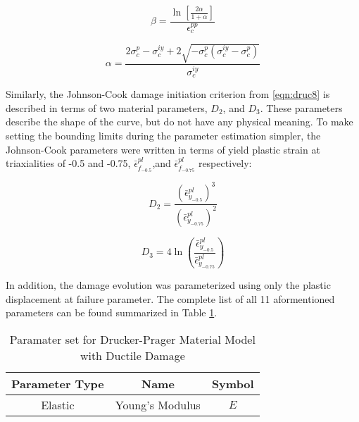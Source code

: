 \begin{equation}
\beta=\frac{\ln\left[\frac{2\alpha}{1+\alpha} \right ]}{\epsilon_c^{pp}}
\label{eqn:param2-2}
\end{equation}

\begin{equation}
\alpha =\frac{2\sigma_c^{p}-\sigma_c^{iy}+2\sqrt{-\sigma_c^p\left(\sigma_c^{iy}-\sigma_c^p \right )}}{\sigma_c^{iy}}
\label{eqn:param2-3}
\end{equation}


Similarly, the Johnson-Cook damage initiation criterion from \ref{eqn:druc8} is described in terms of two material parameters, $D_2$, and $D_3$. These parameters describe the shape of the curve, but do not have any physical meaning. To make setting the bounding limits during the parameter estimation simpler, the Johnson-Cook parameters were written in terms of yield plastic strain at triaxialities of -0.5 and -0.75, $\bar{\epsilon}^{pl}_{f_{-0.5}}$,and $\bar{\epsilon}^{pl}_{f_{-0.75}}$ respectively:

\begin{equation}
D_2=\frac{\left(\bar{\epsilon}^{pl}_{y_{-0.5}}\right)^3}{\left(\bar{\epsilon}^{pl}_{y_{-0.75}}\right)^2}
\label{eqn:dparam8}
\end{equation}

\begin{equation}
D_3=4\ln \left (\frac{\bar{\epsilon}^{pl}_{y_{-0.5}}}{\bar{\epsilon}^{pl}_{y_{-0.75}}}\right )
\label{eqn:dparam9}
\end{equation}

In addition, the damage evolution was parameterized using only the plastic displacement at failure parameter. The complete list of all 11 aformentioned parameters can be found summarized in Table \ref{tab:druckerParameters}.

\begin{table}[]
\centering
\caption{Paramater set for Drucker-Prager Material Model with Ductile Damage}
\label{tab:druckerParameters}
\begin{tabular}{@{}cccc@{}}
\toprule
\multicolumn{2}{c}{\textbf{Parameter Type}}                                                                      & \textbf{Name}                              & \textbf{Symbol}                   \\ \midrule
\multicolumn{2}{c}{\multirow{2}{*}{Elastic}}                                                                     & Young's Modulus                            & $E$                               \\

\end{tabular}
\end{table}

